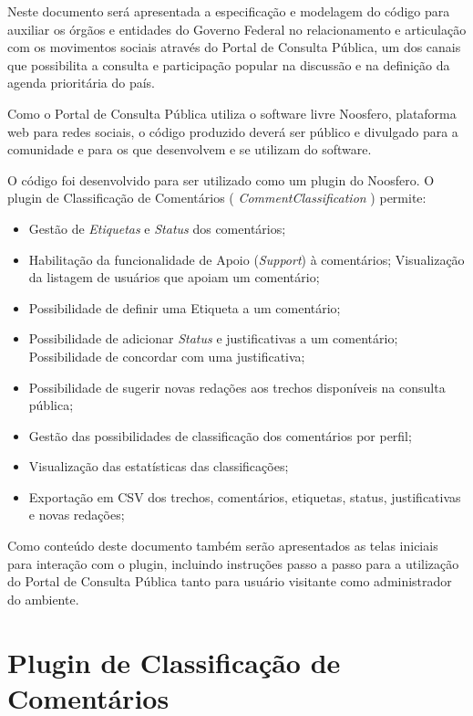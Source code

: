 \documentclass[11pt]{article}
\begin{document}
Neste documento será apresentada a especificação e
modelagem do código para auxiliar os órgãos e entidades do
Governo Federal no relacionamento e articulação com os movimentos
sociais através do Portal de Consulta Pública, um dos canais que
possibilita a consulta e participação popular na discussão e na definição
da agenda prioritária do país.

Como o Portal de Consulta Pública utiliza o software livre Noosfero,
plataforma web para redes sociais, o código produzido deverá ser público
e divulgado para a comunidade e para os que desenvolvem e se utilizam do
software.

O código foi desenvolvido para ser utilizado como um plugin do Noosfero.
O plugin de Classificação de Comentários ( {\it CommentClassification} )
permite:

\begin{itemize}
  \item Gestão de {\it Etiquetas} e {\it Status} dos comentários;
  \item Habilitação da funcionalidade de Apoio ({\it Support}) à
comentários;
    \subitem Visualização da listagem de usuários que apoiam um comentário;
  \item Possibilidade de definir uma Etiqueta a um comentário;
  \item Possibilidade de adicionar {\it Status} e justificativas a um
comentário;
    \subitem Possibilidade de concordar com uma justificativa;
  \item Possibilidade de sugerir novas redações aos trechos disponíveis
na consulta pública;
  \item Gestão das possibilidades de classificação dos comentários por
perfil;
  \item Visualização das estatísticas das classificações;
  \item Exportação em CSV dos trechos, comentários, etiquetas, status,
justificativas e novas redações;
\end{itemize}

Como conteúdo deste documento também serão apresentados as telas
iniciais para interação com o plugin, incluindo instruções passo a
passo para a utilização do Portal de Consulta Pública tanto para usuário
visitante como administrador do ambiente.

\section{Plugin de Classificação de Comentários}
\end{document}
